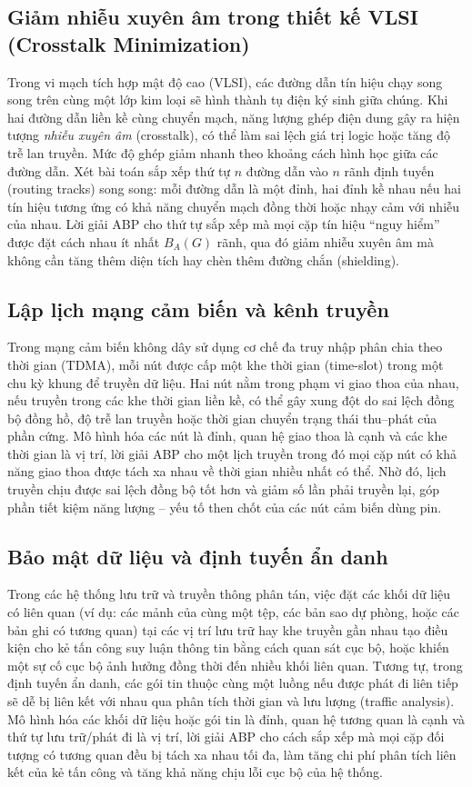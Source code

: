 \documentclass[a4paper,fleqn]{cas-sc}
\begin{document}
\subsection{Giảm nhiễu xuyên âm trong thiết kế VLSI (Crosstalk Minimization)}
Trong vi mạch tích hợp mật độ cao (VLSI), các đường dẫn tín hiệu chạy song song trên cùng một lớp kim loại sẽ hình thành tụ điện ký sinh giữa chúng. Khi hai đường dẫn liền kề cùng chuyển mạch, năng lượng ghép điện dung gây ra hiện tượng \emph{nhiễu xuyên âm} (crosstalk), có thể làm sai lệch giá trị logic hoặc tăng độ trễ lan truyền. Mức độ ghép giảm nhanh theo khoảng cách hình học giữa các đường dẫn. Xét bài toán sắp xếp thứ tự $n$ đường dẫn vào $n$ rãnh định tuyến (routing tracks) song song: mỗi đường dẫn là một đỉnh, hai đỉnh kề nhau nếu hai tín hiệu tương ứng có khả năng chuyển mạch đồng thời hoặc nhạy cảm với nhiễu của nhau. Lời giải ABP cho thứ tự sắp xếp mà mọi cặp tín hiệu ``nguy hiểm'' được đặt cách nhau ít nhất $B_A(G)$ rãnh, qua đó giảm nhiễu xuyên âm mà không cần tăng thêm diện tích hay chèn thêm đường chắn (shielding).

\subsection{Lập lịch mạng cảm biến và kênh truyền}
Trong mạng cảm biến không dây sử dụng cơ chế đa truy nhập phân chia theo thời gian (TDMA), mỗi nút được cấp một khe thời gian (time-slot) trong một chu kỳ khung để truyền dữ liệu. Hai nút nằm trong phạm vi giao thoa của nhau, nếu truyền trong các khe thời gian liền kề, có thể gây xung đột do sai lệch đồng bộ đồng hồ, độ trễ lan truyền hoặc thời gian chuyển trạng thái thu--phát của phần cứng. Mô hình hóa các nút là đỉnh, quan hệ giao thoa là cạnh và các khe thời gian là vị trí, lời giải ABP cho một lịch truyền trong đó mọi cặp nút có khả năng giao thoa được tách xa nhau về thời gian nhiều nhất có thể. Nhờ đó, lịch truyền chịu được sai lệch đồng bộ tốt hơn và giảm số lần phải truyền lại, góp phần tiết kiệm năng lượng -- yếu tố then chốt của các nút cảm biến dùng pin.

\subsection{Bảo mật dữ liệu và định tuyến ẩn danh}
Trong các hệ thống lưu trữ và truyền thông phân tán, việc đặt các khối dữ liệu có liên quan (ví dụ: các mảnh của cùng một tệp, các bản sao dự phòng, hoặc các bản ghi có tương quan) tại các vị trí lưu trữ hay khe truyền gần nhau tạo điều kiện cho kẻ tấn công suy luận thông tin bằng cách quan sát cục bộ, hoặc khiến một sự cố cục bộ ảnh hưởng đồng thời đến nhiều khối liên quan. Tương tự, trong định tuyến ẩn danh, các gói tin thuộc cùng một luồng nếu được phát đi liên tiếp sẽ dễ bị liên kết với nhau qua phân tích thời gian và lưu lượng (traffic analysis). Mô hình hóa các khối dữ liệu hoặc gói tin là đỉnh, quan hệ tương quan là cạnh và thứ tự lưu trữ/phát đi là vị trí, lời giải ABP cho cách sắp xếp mà mọi cặp đối tượng có tương quan đều bị tách xa nhau tối đa, làm tăng chi phí phân tích liên kết của kẻ tấn công và tăng khả năng chịu lỗi cục bộ của hệ thống.
\end{document}
